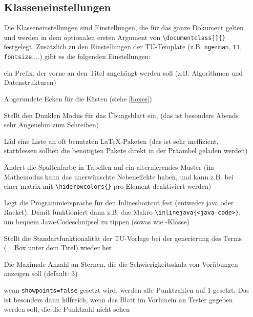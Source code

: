 \documentclass[
    titleprefix=AlgoTeX,
    inlineshortcut=java,
    corporatedesign,
    boxarc,
]{algoexercise}
\begin{document}
    \subsection{Klasseneinstellungen}\label{Klasseneinstellungen}
    \vspace{-1em}
    Die Klasseneinstellungen sind Einstellungen, die für das ganze Dokument gelten und werden in dem optionalen ersten Argument von
    \verb+\documentclass[]{}+ festgelegt.
    Zusätzlich zu den Einstellungen der TU-Template (z.B. \verb+ngerman+, \verb+T1+, \verb+fontsize+,$\ldots$) gibt es die folgenden
    Einstellungen:
    \begin{description}[leftmargin = 3cm]
        \item[titleprefix] ein Prefix, der vorne an den Titel angehängt werden soll
            (z.B. Algorithmen und Datenstrukturen)
        \item[boxarc] Abgerundete Ecken für die Kästen (siehe \ref{boxes})
        \item[dark\_mode]
            Stellt den Dunklen Modus für das Übungsblatt ein, (das ist besonders Abends sehr Angenehm zum Schreiben)
        \item[load\_common] Läd
            eine Liste an oft benutzten \LaTeX{}-Paketen (das ist sehr ineffizient, stattdessen sollten die benötigten Pakete direkt in der
            Präambel geladen werden)
        \item[fancy\_row\_color] Ändert die Spaltenfarbe in Tabellen auf ein alternierendes Muster (im
            Mathemodus kann das unerwünschte Nebeneffekte haben, und kann z.B. bei einer matrix mit \verb+\hiderowcolors{}+ pro Element
            deaktiviert werden)
        \item[inlineshortcut] Legt die Programmiersprache für den Inlineshortcut fest (entweder java oder Racket).
            Damit funktioniert dann z.B. das Makro \verb+\inlinejava{<java-code>}+, um bequem Java-Codeschnipsel zu tippen (sowas wie
            -Klasse)
        \item[manual\_term] Stellt die Standartfunktionalität der TU-Vorlage bei der generierung des Terms (=
            Box unter dem Titel) wieder her
        \item[maxdifficulty] Die Maximale Anzahl an Sternen, die die Schwierigkeitsskala von Vorübungen
            anzeigen soll (default: 3)
        \item[showpoints] wenn \verb+showpoints=false+ gesetzt wird, werden alle Punktzahlen auf 1 gesetzt.
            Das ist besonders dann hilfreich, wenn das Blatt im Vorhinein an Tester gegeben werden soll, die die Punktzahl nicht sehen

\end{description}
\end{document}
